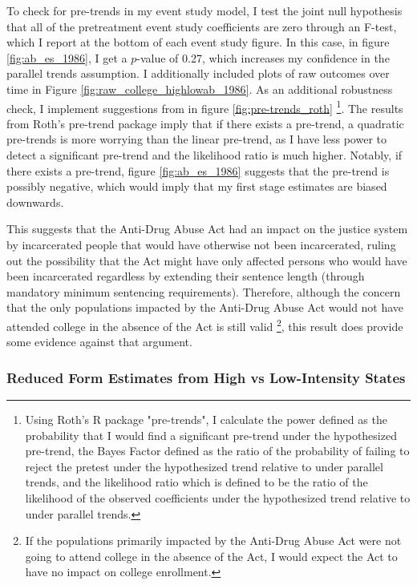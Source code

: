 \documentclass{article}
\begin{document}
To check for pre-trends in my event study model, I test the joint null hypothesis that all of the pretreatment event study coefficients are zero through an F-test, which I report at the bottom of each event study figure. In this case, in figure \ref{fig:ab_es_1986}, I get a $p$-value of 0.27, which increases my confidence in the parallel trends assumption. I additionally included plots of raw outcomes over time in Figure \ref{fig:raw_college_highlowab_1986}. As an additional robustness check, I implement suggestions from \cite{roth2022} in figure \ref{fig:pre-trends_roth} \footnote{Using Roth's R package "pre-trends", I calculate the power defined as the probability that I would find a significant pre-trend under the hypothesized pre-trend, the Bayes Factor defined as the ratio of the probability of failing to reject the pretest under the hypothesized trend relative to under parallel trends, and the likelihood ratio which is defined to be the ratio of the likelihood of the observed coefficients under the hypothesized trend relative to under parallel trends.}. The results from Roth's pre-trend package imply that if there exists a pre-trend, a quadratic pre-trends is more worrying than the linear pre-trend, as I have less power to detect a significant pre-trend and the likelihood ratio is much higher. Notably, if there exists a pre-trend, figure \ref{fig:ab_es_1986} suggests that the pre-trend is possibly negative, which would imply that my first stage estimates are biased downwards.

This suggests that the Anti-Drug Abuse Act had an impact on the justice system by incarcerated people that would have otherwise not been incarcerated, ruling out the possibility that the Act might have only affected persons who would have been incarcerated regardless by extending their sentence length (through mandatory minimum sentencing requirements). Therefore, although the concern that the only populations impacted by the Anti-Drug Abuse Act would not have attended college in the absence of the Act is still valid \footnote{If the populations primarily impacted by the Anti-Drug Abuse Act were not going to attend college in the absence of the Act, I would expect the Act to have no impact on college enrollment.}, this result does provide some evidence against that argument.

\subsubsection{Reduced Form Estimates from High vs Low-Intensity States}
\end{document}
